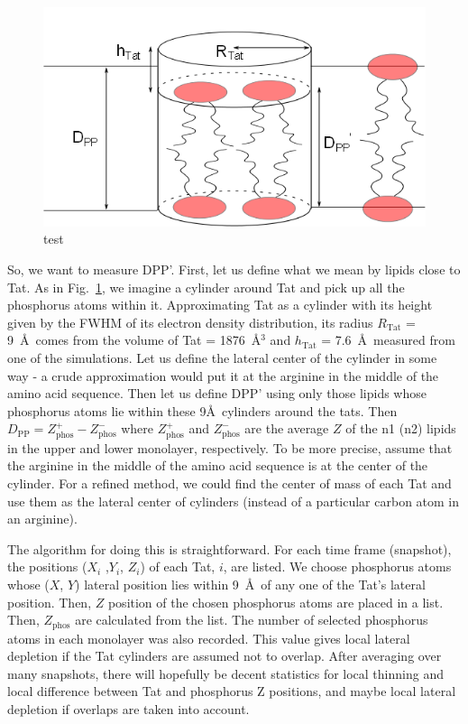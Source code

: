 \documentclass[12pt,letterpaper]{article}
\newcommand{\zphos}{Z_\mathrm{phos}}
\newcommand{\htat}{h_\mathrm{Tat}}
\begin{document}
\begin{figure}[htbp]
  \centering
  \includegraphics[scale=0.5]{./figures/cylinder_model}
  \caption{test}
  \label{fig:cylinder_model}
\end{figure}
So, we want to measure DPP'.  First, let us define what we mean by lipids 
close to Tat.  As in Fig.~\ref{fig:cylinder_model}, we imagine a cylinder around Tat and 
pick up all the phosphorus atoms within it.  Approximating Tat as a cylinder 
with its height given by the FWHM of its electron density distribution, its 
radius $R_\mathrm{Tat}$ = 9~\AA\ comes from the volume of Tat = 1876~\AA$^3$ and 
$\htat$ = 7.6~\AA\
measured from one of the simulations. Let us define the lateral center of the 
cylinder in some way - a crude approximation would put it at the arginine in 
the middle of the amino acid sequence. Then let us define DPP' using only 
those lipids whose phosphorus atoms lie within these 9\AA\ cylinders around the 
tats. Then $D_\mathrm{PP} = \zphos^+ - \zphos^-$ where $\zphos^+$ and $\zphos^-$ 
are the 
average $Z$ of the n1 (n2) lipids in the upper and lower monolayer, respectively.  
To be more precise, assume that the arginine in the middle of the amino acid 
sequence is at the center of the cylinder. For a refined method, we could find 
the center of mass of each Tat and use them as the lateral center of cylinders 
(instead of a particular carbon atom in an arginine). 

The algorithm for doing this is straightforward.  For each time frame 
(snapshot), the positions ($X_i$ ,$Y_i$, $Z_i$) of each Tat, $i$, are listed.   
We choose phosphorus atoms whose ($X$, $Y$) lateral position lies within 
9~\AA\ of any one of the Tat's lateral position. Then, $Z$ position
of the chosen phosphorus atoms are placed in a 
list. Then, $\zphos$ are calculated from the list. 
The number of selected phosphorus atoms in each monolayer was also 
recorded. This value gives local lateral depletion if the Tat cylinders 
are assumed not to overlap. After averaging over many snapshots, 
there will hopefully be decent statistics 
for local thinning and local difference between Tat and phosphorus Z positions, 
and maybe local lateral depletion if overlaps are taken into account.  
\end{document}
